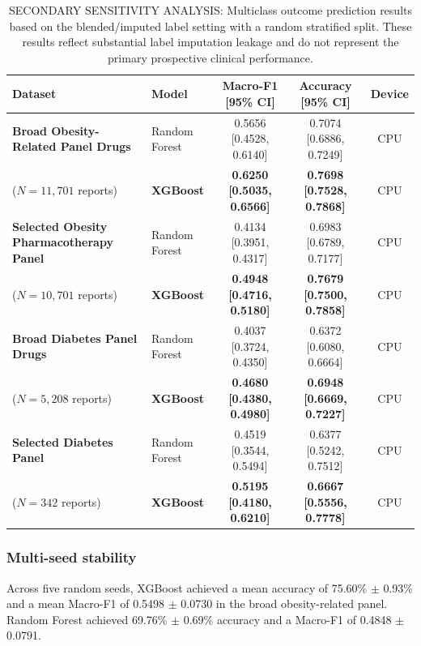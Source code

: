 \documentclass[10pt]{article}
\begin{document}
\begin{table}[!t]
\caption{SECONDARY SENSITIVITY ANALYSIS: Multiclass outcome prediction results based on the blended/imputed label setting with a random stratified split. These results reflect substantial label imputation leakage and do not represent the primary prospective clinical performance.}
\label{tab:main_results}
\centering\small\setlength{\tabcolsep}{6pt}
\begin{tabular}{|l|l|c|c|c|}
\hline
\textbf{Dataset} & \textbf{Model} & \textbf{Macro-F1 [95\% CI]} & \textbf{Accuracy [95\% CI]} & \textbf{Device} \\
\hline
\textbf{Broad Obesity-Related Panel Drugs} & Random Forest & 0.5656 [0.4528, 0.6140] & 0.7074 [0.6886, 0.7249] & CPU \\
\hline
($N=11,701$ reports) & \textbf{XGBoost} & \textbf{0.6250 [0.5035, 0.6566]} & \textbf{0.7698 [0.7528, 0.7868]} & CPU \\
\hline
\textbf{Selected Obesity Pharmacotherapy Panel} & Random Forest & 0.4134 [0.3951, 0.4317] & 0.6983 [0.6789, 0.7177] & CPU \\
\hline
($N=10,701$ reports) & \textbf{XGBoost} & \textbf{0.4948 [0.4716, 0.5180]} & \textbf{0.7679 [0.7500, 0.7858]} & CPU \\
\hline
\textbf{Broad Diabetes Panel Drugs} & Random Forest & 0.4037 [0.3724, 0.4350] & 0.6372 [0.6080, 0.6664] & CPU \\
\hline
($N=5,208$ reports) & \textbf{XGBoost} & \textbf{0.4680 [0.4380, 0.4980]} & \textbf{0.6948 [0.6669, 0.7227]} & CPU \\
\hline
\textbf{Selected Diabetes Panel} & Random Forest & 0.4519 [0.3544, 0.5494] & 0.6377 [0.5242, 0.7512] & CPU \\
\hline
($N=342$ reports) & \textbf{XGBoost} & \textbf{0.5195 [0.4180, 0.6210]} & \textbf{0.6667 [0.5556, 0.7778]} & CPU \\
\hline
\end{tabular}
\end{table}

\subsubsection{Multi-seed stability}
Across five random seeds, XGBoost achieved a mean accuracy of 75.60\% $\pm$ 0.93\% and a mean Macro-F1 of 0.5498 $\pm$ 0.0730 in the broad obesity-related panel. Random Forest achieved 69.76\% $\pm$ 0.69\% accuracy and a Macro-F1 of 0.4848 $\pm$ 0.0791.
\end{document}
